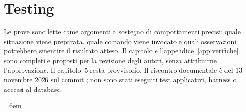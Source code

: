 \chapter{Testing}\label{ch:testing}
Le prove sono lette come argomenti a sostegno di comportamenti precisi:
quale situazione viene preparata, quale comando viene invocato e quali
osservazioni potrebbero smentire il risultato atteso. Il capitolo e
l'appendice~\ref{app:verifiche} sono completi e proposti per la revisione
degli autori, senza attribuirne l'approvazione. Il capitolo~5 resta provvisorio.
Il riscontro documentale è del 13 novembre 2026 sul commit ;
non sono stati eseguiti test applicativi, harness o accessi al database.

\begingroup
\def\UrlBreaks{\do\a\do\b\do\c\do\d\do\e\do\f\do\g\do\h\do\i\do\j\do\k\do\l\do\m\do\n\do\o\do\p\do\q\do\r\do\s\do\t\do\u\do\v\do\w\do\x\do\y\do\z\do\A\do\B\do\C\do\D\do\E\do\F\do\G\do\H\do\I\do\J\do\K\do\L\do\M\do\N\do\O\do\P\do\Q\do\R\do\S\do\T\do\U\do\V\do\W\do\X\do\Y\do\Z}
\emergencystretch=6em
\renewcommand{\lstlistingname}{Frammento}

